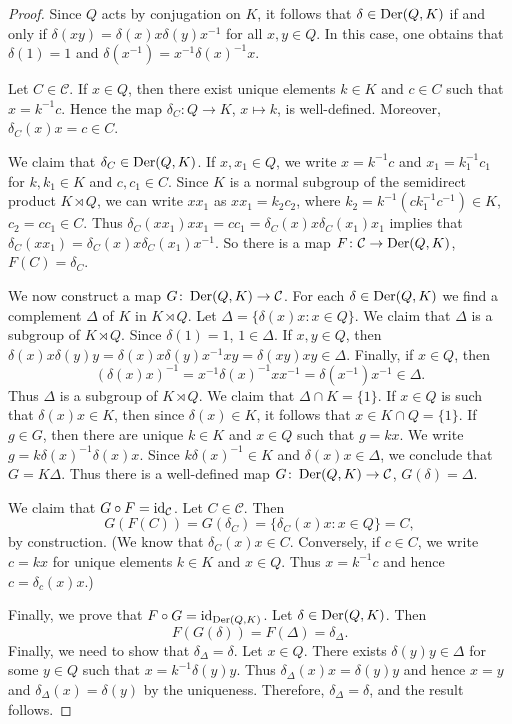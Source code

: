 \begin{proof}
	Since $Q$ acts by conjugation on $K$, it follows that $\delta\in\operatorname{Der}(Q,K)$ if and only if 
	$\delta(xy)=\delta(x)x\delta(y)x^{-1}$ for all $x,y\in Q$. In this case, 
	one obtains that 
	$\delta(1)=1$ and $\delta(x^{-1})=x^{-1}\delta(x)^{-1}x$.
	
	Let 
	$C\in\mathcal{C}$. If $x\in Q$, then there exist unique elements  
	$k\in K$ and $c\in C$ such that $x=k^{-1}c$. Hence the  map 
	$\delta_C\colon Q\to K$, $x\mapsto k$, is well-defined. Moreover, 
	$\delta_C(x)x=c\in C$. 
	
	We claim that $\delta_C\in\operatorname{Der}(Q,K)$. If $x,x_1\in Q$, we write $x=k^{-1}c$
	and $x_1=k_1^{-1}c_1$ for $k,k_1\in K$ and $c,c_1\in C$. Since $K$ is a normal subgroup of 
	the semidirect product $K\rtimes Q$, we can write $xx_1$ as $xx_1=k_2c_2$, where 
	$k_2=k^{-1}(ck_1^{-1}c^{-1})\in K$, $c_2=cc_1\in C$. Thus  
	$\delta_C(xx_1)xx_1=cc_1=\delta_C(x)x\delta_C(x_1)x_1$ 
	implies that $\delta_C(xx_1)=\delta_C(x)x\delta_C(x_1)x^{-1}$. 
	So there is a map $F\colon\mathcal{C}\to\operatorname{Der}(Q,K)$, $F(C)=\delta_C$.

	We now construct a map $G\colon\operatorname{Der}(Q,K)\to\mathcal{C}$. 
	For each 
	$\delta\in\operatorname{Der}(Q,K)$ we find a complement $\Delta$ of $K$ in $K\rtimes Q$. Let 
	$\Delta=\{\delta(x)x:x\in Q\}$. 
	We claim that $\Delta$ is a subgroup of $K\rtimes Q$. Since $\delta(1)=1$,
	$1\in \Delta$. If $x,y\in Q$, then 
	$\delta(x)x\delta(y)y=\delta(x)x\delta(y)x^{-1}xy=\delta(xy)xy\in \Delta$.
	Finally, if $x\in Q$, then 
	\[
	(\delta(x)x)^{-1}=x^{-1}\delta(x)^{-1}xx^{-1}=\delta(x^{-1})x^{-1}\in \Delta.
	\]
	Thus $\Delta$ is a subgroup of $K\rtimes Q$.
	We claim that $\Delta\cap K=\{1\}$. If $x\in Q$ is such that $\delta(x)x\in K$, then 
    since $\delta(x)\in K$, it follows that $x\in K\cap Q=\{1\}$. If $g\in G$, then 
	there are unique $k\in K$ and $x\in Q$ such that $g=kx$. We write 
	$g=k\delta(x)^{-1}\delta(x)x$. Since $k\delta(x)^{-1}\in K$ and $\delta(x)x\in
	\Delta$, we conclude that $G=K\Delta$. Thus there is a well-defined map 
	$G\colon\operatorname{Der}(Q,K)\to\mathcal{C}$, $G(\delta)=\Delta$.

	We claim that $G\circ F=\operatorname{id}_{\mathcal{C}}$. 
	Let $C\in\mathcal{C}$. Then  
	\[
	G(F(C))=G(\delta_C)=\{\delta_C(x)x:x\in
	Q\}=C,
	\]
	by construction. (We know that $\delta_C(x)x\in C$. Conversely, if $c\in
	C$, we write $c=kx$ for unique elements $k\in K$ and $x\in Q$. Thus $x=k^{-1}c$
	and hence $c=\delta_c(x)x$.)

	Finally, we prove that $F\circ G=\operatorname{id}_{\operatorname{Der}(Q,K)}$. Let $\delta\in\operatorname{Der}(Q,K)$.
    Then	
    \[
	F(G(\delta))=F(\Delta)=\delta_{\Delta}.
	\]
	Finally, we need to show that $\delta_\Delta=\delta$.  Let $x\in Q$. There exists 
	$\delta(y)y\in\Delta$ for some $y\in Q$ such that $x=k^{-1}\delta(y)y$.
	Thus $\delta_{\Delta}(x)x=\delta(y)y$ and hence $x=y$ and $\delta_{\Delta}(x)=\delta(y)$ by
	the uniqueness. Therefore, $\delta_{\Delta}=\delta$, and the result follows. 
\end{proof}

